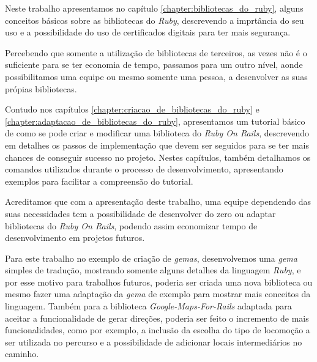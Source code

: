 Neste trabalho apresentamos no capítulo \ref{chapter:bibliotecas_do_ruby}, alguns conceitos básicos
sobre as bibliotecas do \emph{Ruby}, descrevendo a imprtância do seu uso e a possibilidade do uso
de certificados digitais para ter mais segurança.

Percebendo que somente a utilização de bibliotecas de terceiros, as vezes não é o suficiente para se
ter economia de tempo, passamos para um outro nível, aonde possibilitamos uma equipe ou mesmo somente
uma pessoa, a desenvolver as suas própias bibliotecas.

Contudo nos capítulos \ref{chapter:criacao_de_bibliotecas_do_ruby} e
\ref{chapter:adaptacao_de_bibliotecas_do_ruby}, apresentamos um tutorial
básico de como se pode criar e modificar uma biblioteca do \emph{Ruby On Rails}, descrevendo em
detalhes os passos de implementação que devem ser seguidos para se ter mais chances de conseguir
sucesso no projeto. Nestes capítulos, também detalhamos os comandos utilizados durante o processo
de desenvolvimento, apresentando exemplos para facilitar a compreensão do tutorial.

Acreditamos que com a apresentação deste trabalho, uma equipe dependendo das suas necessidades tem
a possibilidade de desenvolver do zero ou adaptar bibliotecas do \emph{Ruby On Rails}, podendo assim
economizar tempo de desenvolvimento em projetos futuros.

Para este trabalho no exemplo de criação de \emph{gemas}, desenvolvemos uma \emph{gema} simples de
tradução, mostrando somente alguns detalhes da linguagem \emph{Ruby}, e por esse motivo para
trabalhos futuros, poderia ser criada uma nova biblioteca ou mesmo fazer uma adaptação da
\emph{gema} de exemplo para mostrar mais conceitos da linguagem. Também para a biblioteca
\emph{Google-Maps-For-Rails} adaptada para aceitar a funcionalidade de gerar direções, poderia ser feito o
incremento de mais funcionalidades, como por exemplo, a inclusão da escolha do tipo de locomoção a ser
utilizada no percurso e a possibilidade de adicionar locais intermediários no caminho.